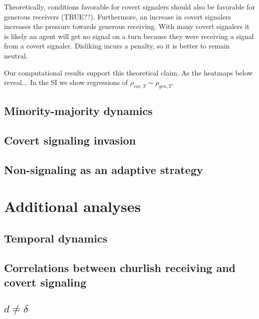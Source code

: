 \documentclass[11pt,letterpaper]{article}
\begin{document}
Theoretically, conditions favorable for covert
signalers should also be favorable for generous receivers (TRUE??). Furthermore, 
an increase in covert signalers increases the pressure towards generous receiving.
With many covert signalers it is likely an agent will get no signal on a 
turn because they were receiving a signal from a covert signaler. Disliking
incurs a penalty, so it is better to remain neutral.

Our computational results support this theoretical claim. As the heatmaps
below reveal... In the SI we show regressions of $\rho_{cov,T} \sim \rho_{gen,T}$.

\subsection{Minority-majority dynamics}

\subsection{Covert signaling invasion}

\subsection{Non-signaling as an adaptive strategy}

% 


% 

\appendix

\section{Additional analyses}

\subsection{Temporal dynamics}

\subsection{Correlations between churlish receiving and covert signaling}

\subsection{$d \neq \delta$}
\end{document}
